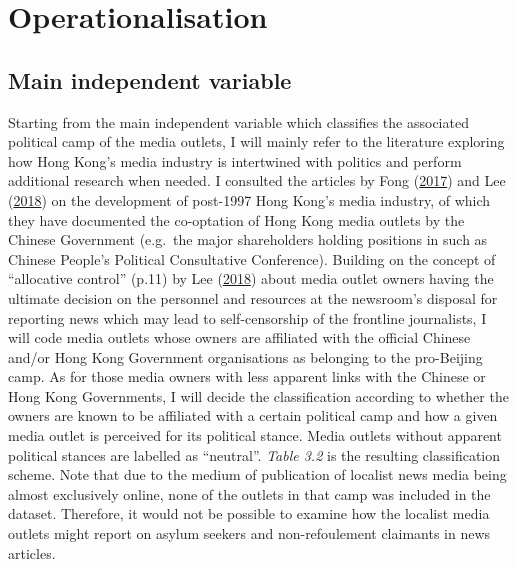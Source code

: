 \documentclass[a4paper, oneside]{report}
\begin{document}
\hypertarget{operationalisation}{%
\section{Operationalisation}\label{operationalisation}}

\hypertarget{main-independent-variable}{%
\subsection{Main independent variable}\label{main-independent-variable}}

Starting from the main independent variable which classifies the
associated political camp of the media outlets, I will mainly refer to
the literature exploring how Hong Kong's media industry is intertwined
with politics and perform additional research when needed. I consulted
the articles by Fong
(\protect\hyperlink{ref-fongInbetweenLiberalAuthoritarianism2017}{2017})
and Lee (\protect\hyperlink{ref-leeChangingPoliticalEconomy2018}{2018})
on the development of post-1997 Hong Kong's media industry, of which
they have documented the co-optation of Hong Kong media outlets by the
Chinese Government (e.g.~the major shareholders holding positions in
such as Chinese People's Political Consultative Conference). Building on
the concept of ``allocative control'' (p.11) by Lee
(\protect\hyperlink{ref-leeChangingPoliticalEconomy2018}{2018}) about
media outlet owners having the ultimate decision on the personnel and
resources at the newsroom's disposal for reporting news which may lead
to self-censorship of the frontline journalists, I will code media
outlets whose owners are affiliated with the official Chinese and/or
Hong Kong Government organisations as belonging to the pro-Beijing camp.
As for those media owners with less apparent links with the Chinese or
Hong Kong Governments, I will decide the classification according to
whether the owners are known to be affiliated with a certain political
camp and how a given media outlet is perceived for its political stance.
Media outlets without apparent political stances are labelled as
``neutral''. \emph{Table 3.2} is the resulting classification scheme.
Note that due to the medium of publication of localist news media being
almost exclusively online, none of the outlets in that camp was included
in the dataset. Therefore, it would not be possible to examine how the
localist media outlets might report on asylum seekers and
non-refoulement claimants in news articles.
\end{document}
